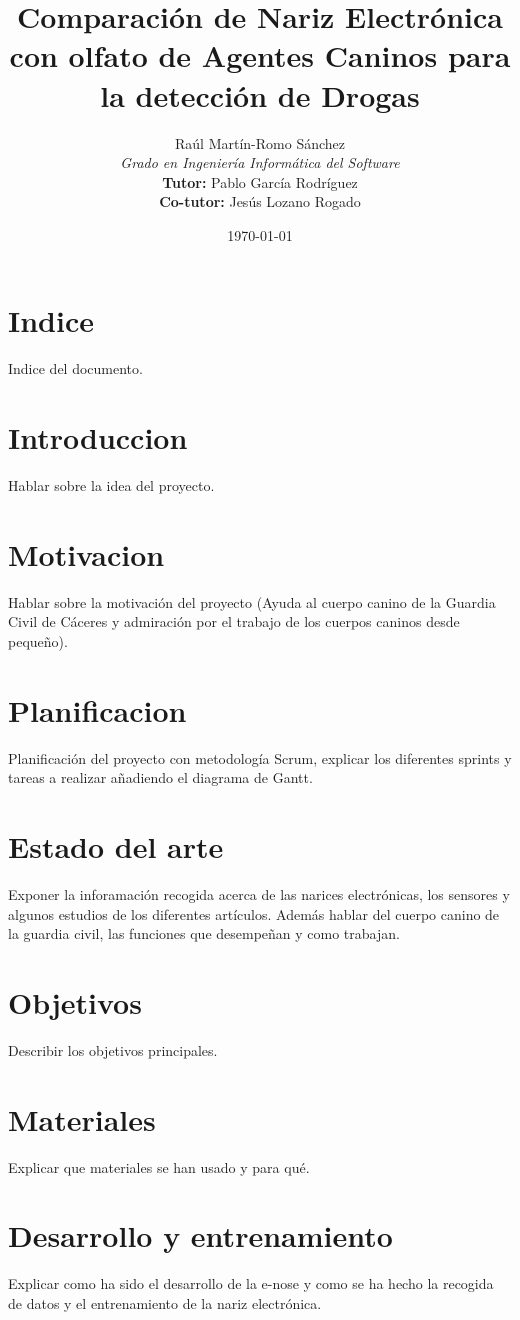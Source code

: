 \documentclass[12pt,a4paper,oneside]{report}
\title{Comparación de Nariz Electrónica con olfato de Agentes Caninos para la detección de Drogas}
\author{Raúl Martín-Romo Sánchez\\
	\textit{Grado en Ingeniería Informática del Software}\\
	\textbf{Tutor:} Pablo García Rodríguez\\
    \textbf{Co-tutor:} Jesús Lozano Rogado}
\date{\today}
\begin{document}
\maketitle

\section{Indice}
Indice del documento.

\section{Introduccion}
Hablar sobre la idea del proyecto.

\section{Motivacion}
Hablar sobre la motivación del proyecto (Ayuda al cuerpo canino de la Guardia Civil de Cáceres y admiración por el trabajo de los cuerpos caninos desde pequeño).

\section{Planificacion}
Planificación del proyecto con metodología Scrum, explicar los diferentes sprints y tareas a realizar añadiendo el diagrama de Gantt.

\section{Estado del arte}
Exponer la inforamación recogida acerca de las narices electrónicas, los sensores y algunos estudios de los diferentes artículos. Además hablar del cuerpo canino de la guardia civil, las funciones que desempeñan y como trabajan.

\section{Objetivos}
Describir los objetivos principales.

\section{Materiales}
Explicar que materiales se han usado y para qué.

\section{Desarrollo y entrenamiento}
Explicar como ha sido el desarrollo de la e-nose y  como se ha hecho la recogida de datos y el entrenamiento de la nariz electrónica.
\end{document}
